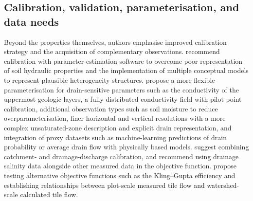 \subsection{Calibration, validation, parameterisation, and data needs}

Beyond the properties themselves, authors emphasise improved calibration
strategy and the acquisition of complementary observations.
\textcite{Boico2022} recommend calibration with parameter-estimation software
to overcome poor representation of soil hydraulic properties and the
implementation of multiple conceptual models to represent plausible
heterogeneity structures. \textcite{Schneider2022} propose a more flexible
parameterisation for drain-sensitive parameters such as the conductivity of
the uppermost geologic layers, a fully distributed conductivity field with
pilot-point calibration, additional observation types such as soil moisture to
reduce overparameterisation, finer horizontal and vertical resolutions with a
more complex unsaturated-zone description and explicit drain representation,
and integration of proxy datasets such as machine-learning predictions of
drain probability or average drain flow with physically based models.
\textcite{DeSchepper2017} suggest combining catchment- and drainage-discharge
calibration, and \textcite{Sedaghatdoost2019} recommend using drainage
salinity data alongside other measured data in the objective function.
\textcite{Brighenti2023} propose testing alternative objective functions such
as the Kling--Gupta efficiency and establishing relationships between
plot-scale measured tile flow and watershed-scale calculated tile flow.

